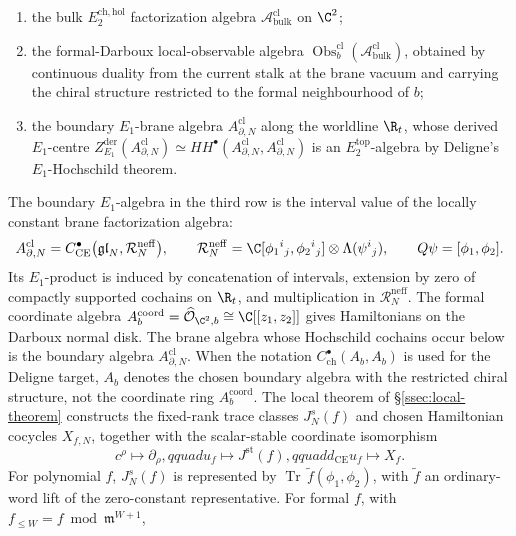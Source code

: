 \documentclass[11pt]{memoir}
\begin{document}
\begin{enumerate}
\item the bulk \(E_2^{\mathrm{ch,hol}}\) factorization algebra
  \(\mathcal A^{\mathrm{cl}}_{\mathrm{bulk}}\) on \(\C^2\);
\item the formal-Darboux local-observable algebra
  \(\operatorname{Obs}^{\mathrm{cl}}_b(\mathcal A^{\mathrm{cl}}_{\mathrm{bulk}})\),
  obtained by continuous duality from the current stalk at the brane
  vacuum and carrying the chiral structure restricted to the formal
  neighbourhood of \(b\);
\item the boundary \(E_1\)-brane algebra
  \(A^{\mathrm{cl}}_{\partial,N}\) along the worldline \(\R_t\),
  whose derived \(E_1\)-centre
  \(Z^{\mathrm{der}}_{E_1}(A^{\mathrm{cl}}_{\partial,N})\simeq
  HH^\bullet(A^{\mathrm{cl}}_{\partial,N},
  A^{\mathrm{cl}}_{\partial,N})\) is an \(E_2^{\mathrm{top}}\)-algebra by
  Deligne's \(E_1\)-Hochschild theorem.
\end{enumerate}
The boundary \(E_1\)-algebra in the third row is the interval value of
the locally constant brane factorization algebra:
\[
  A^{\mathrm{cl}}_{\partial,N}
    =
    C^\bullet_{\mathrm{CE}}\bigl(\mathfrak{gl}_N,
       \mathcal R_N^{\mathrm{neff}}\bigr),
  \qquad
  \mathcal R_N^{\mathrm{neff}}
    =
    \C[\phi_1{}^i{}_j,\phi_2{}^i{}_j]\otimes\Lambda(\psi^i{}_j),
  \qquad
  Q\psi=[\phi_1,\phi_2].
\]
Its \(E_1\)-product is induced by concatenation of intervals, extension
by zero of compactly supported cochains on \(\R_t\), and multiplication
in \(\mathcal R_N^{\mathrm{neff}}\).
The formal coordinate algebra
\(A_b^{\mathrm{coord}}=\widehat{\mathcal O}_{\C^2,b}\cong\C[[z_1,z_2]]\)
gives Hamiltonians on the Darboux normal disk.  The brane algebra
whose Hochschild cochains occur below is the boundary algebra
\(A^{\mathrm{cl}}_{\partial,N}\).  When the notation
\(C^\bullet_{\mathrm{ch}}(A_b,A_b)\) is used for the Deligne target,
\(A_b\) denotes the chosen boundary algebra with the restricted chiral
structure, not the coordinate ring \(A_b^{\mathrm{coord}}\).
The local theorem of \S\ref{ssec:local-theorem} constructs the
fixed-rank trace classes \(J_N^s(f)\) and chosen Hamiltonian cocycles
\(X_{f,N}\), together with the scalar-stable coordinate isomorphism
\[
  c^\rho\mapsto\partial_\rho,qquad
  u_f\mapsto J^{\mathrm{st}}(f),qquad
  d_{\mathrm{CE}}u_f\mapsto X_f.
\]
For polynomial \(f\), \(J_N^s(f)\) is represented by
\(\operatorname{Tr}\,\tilde f(\phi_1,\phi_2)\), with
\(\tilde f\) an ordinary-word lift of the zero-constant representative.
For formal \(f\), with
\(f_{\leq W}=f\bmod\mathfrak m^{W+1}\),
\end{document}
